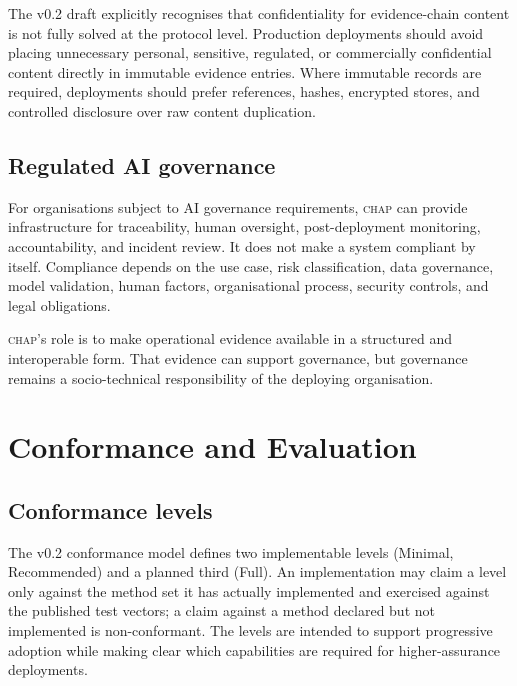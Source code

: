 \documentclass[11pt]{article}
\newcommand{\chap}{\textsc{chap}}
\begin{document}
The v0.2 draft explicitly recognises that confidentiality for evidence-chain content is not fully solved at the protocol level. Production deployments should avoid placing unnecessary personal, sensitive, regulated, or commercially confidential content directly in immutable evidence entries. Where immutable records are required, deployments should prefer references, hashes, encrypted stores, and controlled disclosure over raw content duplication.

\subsection{Regulated AI governance}

For organisations subject to AI governance requirements, \chap{} can provide infrastructure for traceability, human oversight, post-deployment monitoring, accountability, and incident review. It does not make a system compliant by itself. Compliance depends on the use case, risk classification, data governance, model validation, human factors, organisational process, security controls, and legal obligations.

\chap{}'s role is to make operational evidence available in a structured and interoperable form. That evidence can support governance, but governance remains a socio-technical responsibility of the deploying organisation.

\section{Conformance and Evaluation}
\label{sec:conformance}

\subsection{Conformance levels}

The v0.2 conformance model defines two implementable levels (Minimal, Recommended) and a planned third (Full). An implementation may claim a level only against the method set it has actually implemented and exercised against the published test vectors; a claim against a method declared but not implemented is non-conformant. The levels are intended to support progressive adoption while making clear which capabilities are required for higher-assurance deployments.
\end{document}
